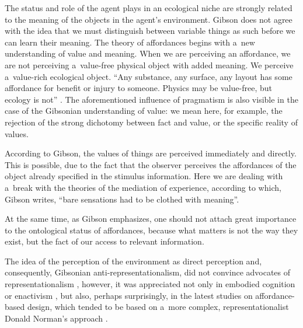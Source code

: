 \documentclass[%
manuscript=article,
year=2024,
volume=77,
doi=00000.000,
]{zfn}
\begin{document}
The status and role of the agent plays in an ecological niche are strongly related to the meaning of the objects in the agent's environment. Gibson does not agree with the idea that we must distinguish between variable things as such before we can learn their meaning. The theory of affordances begins with a~new understanding of value and meaning. When we are perceiving an affordance, we are not perceiving a~value-free physical object with added meaning. We perceive a~value-rich ecological object. ``Any substance, any surface, any layout has some affordance for benefit or injury to someone. Physics may be value-free, but ecology is not'' 
\parencite[][p.140]{gibson_ecological_1979}. %
 The aforementioned influence of pragmatism is also visible in the case of the Gibsonian understanding of value: we mean here, for example, the rejection of the strong dichotomy between fact and value, or the specific reality of values.



According to Gibson, the values of things are perceived immediately and directly. This is possible, due to the fact that the observer perceives the affordances of the object already specified in the stimulus information. Here we are dealing with a~break with the theories of the mediation of experience, according to which, Gibson 
\parencite*[][p.140]{gibson_ecological_1979} %
 writes, ``bare sensations had to be clothed with meaning''.



At the same time, as Gibson emphasizes, one should not attach great importance to the ontological status of affordances, because what matters is not the way they exist, but the fact of our access to relevant information.



The idea of the perception of the environment as direct perception and, consequently, Gibsonian anti-representationalism, did not convince advocates of representationalism 
\parencite[e.g.,][]{fodor_how_1981}, %
 however, it was appreciated not only in embodied cognition or enactivism 
\parencite[][]{herasescribano_philosophy_2019}, %
 but also, perhaps surprisingly, in the latest studies on affordance-based design, which tended to be based on a~more complex, representationalist Donald Norman's approach 
\parencite[see][]{masoudi_review_2019}.%
\end{document}
